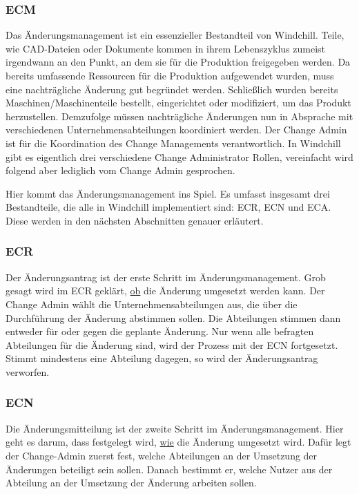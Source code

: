 \subsubsection{\acl{ECM}}
Das Änderungsmanagement ist ein essenzieller Bestandteil von Windchill.
Teile, wie \zB CAD-Dateien oder Dokumente kommen in ihrem Lebenszyklus zumeist irgendwann an den Punkt, an dem sie für die Produktion freigegeben werden.
Da bereits umfassende Ressourcen für die Produktion aufgewendet wurden, muss eine nachträgliche Änderung gut begründet werden.
Schließlich wurden bereits Maschinen/Maschinenteile bestellt, eingerichtet oder modifiziert, um das Produkt herzustellen.
Demzufolge müssen nachträgliche Änderungen nun in Absprache mit verschiedenen Unternehmensabteilungen koordiniert werden.
Der Change Admin ist für die Koordination des Change Managements verantwortlich.
In Windchill gibt es eigentlich drei verschiedene Change Administrator Rollen, vereinfacht wird folgend aber lediglich vom Change Admin gesprochen.

Hier kommt das Änderungsmanagement ins Spiel.
Es umfasst insgesamt drei Bestandteile, die alle in Windchill implementiert sind: \acl{ECR}, \acl{ECN} und \acl{ECA}.
Diese werden in den nächsten Abschnitten genauer erläutert.

\subsubsection{\acl{ECR}}
Der Änderungsantrag ist der erste Schritt im Änderungsmanagement.
Grob gesagt wird im \ac{ECR} geklärt, \underline{ob} die Änderung umgesetzt werden kann.
Der Change Admin wählt die Unternehmensabteilungen aus, die über die Durchführung der Änderung abstimmen sollen.
Die Abteilungen stimmen dann entweder für oder gegen die geplante Änderung.
Nur wenn alle befragten Abteilungen für die Änderung sind, wird der Prozess mit der \ac{ECN} fortgesetzt.
Stimmt mindestens eine Abteilung dagegen, so wird der Änderungsantrag verworfen.

\subsubsection{\acl{ECN}}
Die Änderungsmitteilung ist der zweite Schritt im Änderungsmanagement.
Hier geht es darum, dass festgelegt wird, \underline{wie} die Änderung umgesetzt wird.
Dafür legt der Change-Admin zuerst fest, welche Abteilungen an der Umsetzung der Änderungen beteiligt sein sollen.
Danach bestimmt er, welche Nutzer aus der Abteilung an der Umsetzung der Änderung arbeiten sollen.

